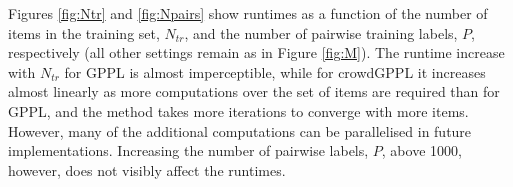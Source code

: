 Figures \ref{fig:Ntr} and \ref{fig:Npairs} show runtimes as a
function of the number of items in the training set, $N_{tr}$,
and the number of pairwise training labels, $P$, respectively (all other settings remain as in Figure \ref{fig:M}).
The runtime increase with $N_{tr}$ for GPPL is almost imperceptible,
while for crowdGPPL it increases almost linearly as more
computations over the set of items are required than for GPPL, and the method takes more iterations to converge with more items. 
However, many of the additional computations can be parallelised
in future implementations.
Increasing the number of pairwise labels, $P$, above 1000, however, does not visibly affect the runtimes.
